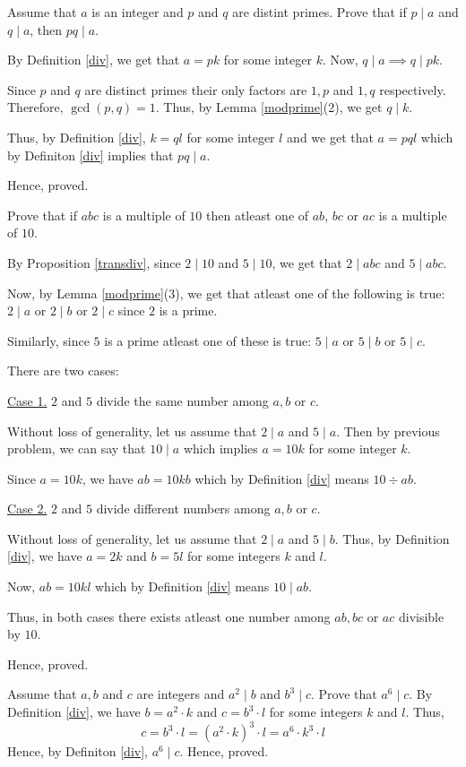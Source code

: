 \bp 
	Assume that $a$ is an integer and $p$ and $q$ are distint primes. Prove that if $p \mid a$ and $q \mid a$, then $pq \mid a$.
\ep 

\bs
	By Definition \ref{div}, we get that $a = pk$ for some integer $k$. Now, $q \mid a \implies q \mid pk$.

	Since $p$ and $q$ are distinct primes their only factors are $1,p$ and $1,q$ respectively. Therefore, $\gcd(p, q) = 1$. Thus, by Lemma \ref{modprime}(2), we get $q \mid k$.

	Thus, by Definition \ref{div}, $k = ql$ for some integer $l$ and we get that $a = pql$ which by Definiton \ref{div} implies that $pq \mid a$.

	Hence, proved.
\es

\bp 
Prove that if $abc$ is a multiple of $10$ then atleast one of $ab$, $bc$ or $ac$ is a multiple of $10$.
\ep 

\bs
	By Proposition \ref{transdiv}, since $2 \mid 10$ and $5 \mid 10$, we get that $2 \mid abc$ and $5 \mid abc$.

	Now, by Lemma \ref{modprime}(3), we get that atleast one of the following is true: $2 \mid a$ or $2 \mid b$ or $2 \mid c$ since $2$ is a prime.

	Similarly, since $5$ is a prime atleast one of these is true: $5 \mid a$ or $5 \mid b$ or $5 \mid c$.

	There are two cases:
	
	\underline{Case 1.} $2$ and $5$ divide the same number among $a, b$ or $c$.

	Without loss of generality, let us assume that $2 \mid a$ and $5 \mid a$. Then by previous problem, we can say that $10 \mid a$ which implies $a = 10k$ for some integer $k$.
	
	Since $a = 10k$, we have $ab = 10kb$ which by Definition \ref{div} means $10 \div ab$. 

	\underline{Case 2.} $2$ and $5$ divide different numbers among $a, b$ or $c$.

	Without loss of generality, let us assume that $2 \mid a$ and $5 \mid b$. Thus, by Definition \ref{div}, we have $a = 2k$ and $b = 5l$ for some integers $k$ and $l$.

	Now, $ab = 10kl$ which by Definition \ref{div} means $10 \mid ab$.

	Thus, in both cases there exists atleast one number among $ab, bc$ or $ac$ divisible by $10$.

	Hence, proved.
\es

\bp 
	Assume that $a, b$ and $c$ are integers and $a^2 \mid b$ and $b^3 \mid c$. Prove that $a^6 \mid c$.
\ep 
\bs
	By Definition \ref{div}, we have $b = a^2 \cdot k$ and $c =  b^3 \cdot l$ for some integers $k$ and $l$. Thus,
	$$c = b^3 \cdot l = (a^2 \cdot k)^3 \cdot l = a^6 \cdot k^3 \cdot l$$
Hence, by Definiton \ref{div}, $a^6 \mid c$. Hence, proved.
\es

